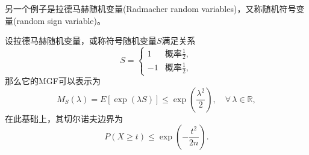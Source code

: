 另一个例子是拉德马赫随机变量(Radmacher random variables)，又称随机符号变量(random sign variable)。
\begin{proposition}[拉德马赫随机变量的切尔诺夫边界]
  \label{proposition:radmacher-sign-variable}
  设拉德马赫随机变量，或称符号随机变量$S$满足关系
 \begin{equation*}
   S =
   \begin{cases}
   1 & \text{概率}\frac{1}{2}, \\
   -1 &   \text{概率}\frac{1}{2},
   \end{cases}
 \end{equation*}
 那么它的MGF可以表示为
  \begin{equation}
    \label{eq:lln-slln-radmacher-mgf}
    M_{S} \left( \lambda \right)
    = E \left[ \exp \left( \lambda S \right) \right]
    \le \exp \left( \frac{\lambda^{2}}{2} \right), \quad \forall \, \lambda \in \mathbb{R},
  \end{equation}
  在此基础上，其切尔诺夫边界为
  \begin{equation}
    \label{eq:lln-slln-radmacher-chernoff}
    P \left( X \ge t \right) \le \exp \left( - \frac{t^{2}}{2 n} \right).
  \end{equation}
\end{proposition}

